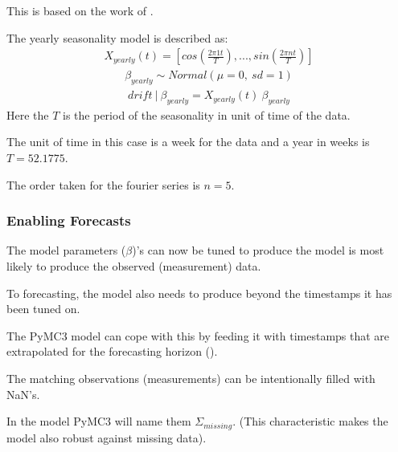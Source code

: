 \documentclass[letterpaper,10pt,english]{sphinxmanual}
\begin{document}
This is based on the work of .

The yearly seasonality model is described as:
\begin{equation*}
\begin{split}X_{yearly}(t) = [cos(\frac{2 \pi 1 t}{T}), ..., sin(\frac{2 \pi n t}{T})]\end{split}
\end{equation*}\begin{equation*}
\begin{split}\beta_{yearly} \sim Normal(\mu=0, \:sd=1)\end{split}
\end{equation*}\begin{equation*}
\begin{split}drift\:|\:\beta_{yearly} = X_{yearly}(t)\:\beta_{yearly}\end{split}
\end{equation*}
Here the \(T\) is the period of the seasonality in unit of time of the data.

The unit of time in this case is a week for the data and a year in weeks is \(T=52.1775\).

The order taken for the fourier series is \(n=5\).


\subsubsection{Enabling Forecasts}
\label{\detokenize{modeling:enabling-forecasts}}
The model parameters (\(\beta\))’s can now be tuned to produce the model is most likely to produce the observed (measurement) data.

To forecasting, the model also needs to produce beyond the timestamps it has been tuned on.

The PyMC3 model can cope with this by feeding it with timestamps that are extrapolated for the forecasting horizon ({\hyperref[\detokenize{autoapi/src/preprocess/preprocess/index:src.preprocess.preprocess.extrapolate_timestamps}]{}}).

The matching observations (measurements) can be intentionally filled with NaN’s.

In the model PyMC3 will name them \(\Sigma_{missing}\).
(This characteristic makes the model also robust against missing data).
\end{document}

